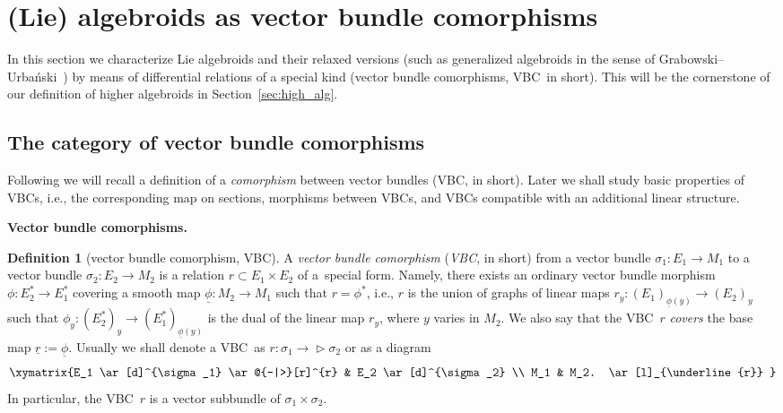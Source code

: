 \documentclass[pdftex]{sigma}
\newcommand{\ZM}{{VBC}} %
\newcommand{\Zakrzewski}{{vector bundle comorphism}}
\newcommand{\BIGZakrzewski}{{Vector bundle comorphism}}
\newcommand{\und}{\underline}
\newcommand{\ra}{\rightarrow}
\def\relto{\rightarrow\!\!\vartriangleright} %
\numberwithin{equation}{section}
\theoremstyle{definition}
\newtheorem{df}[thm]{Definition}
\begin{document}
\section{(Lie) algebroids as \Zakrzewski s}\label{sec:algebroids_as_zm}

In this section we characterize Lie algebroids and their relaxed versions (such as generalized algebroids in the sense of Grabowski--Urba\'nski~\cite{JG_PU_Algebroids_1999}) by means of differential relations of a special kind (\Zakrzewski s, \ZM\ in short). This will be the cornerstone of our definition of higher algebroids in Section~\ref{sec:high_alg}.

\subsection{The category of \Zakrzewski s}

Following \cite{HM_1993, Mackenzie_lie_2005} we will recall a definition of a \emph{comorphism} between vector bundles (\ZM, in short). Later we shall study basic properties of \ZM s, i.e., the corresponding map on sections, morphisms between \ZM s, and \ZM s compatible with an additional linear structure.

{\bf \BIGZakrzewski s.}
\begin{df}[\Zakrzewski, \ZM ]\label{def:zm} A \emph{\Zakrzewski } (\emph{\ZM }, in short) from a vector bundle $\sigma_1\colon E_1\ra M_1$ to a vector bundle $\sigma_2\colon E_2\ra M_2$ is a relation $r\subset E_1 \times E_2$ of a~special form. Namely, there exists an ordinary vector bundle morphism $\phi\colon E_2^\ast\ra E_1^\ast$ covering a smooth map $\und{\phi}\colon M_2\ra M_1$ such that $r = \phi^\ast$, i.e., $r$ is the union of graphs of linear maps $r_y\colon (E_1)_{\und{\phi}(y)} \ra (E_2)_{y}$ such that $\phi_y\colon (E_2^\ast)_{y} \ra (E_1^\ast)_{\und{\phi}(y)}$ is the dual of the linear map $r_y$, where $y$ varies in $M_2$. We also say that the \ZM\ $r$ \emph{covers} the base map $\und{r}:=\und{\phi}$. Usually we shall denote a \ZM\ as $r\colon \sigma_1\relto \sigma_2$ or as a diagram
\begin{gather*}
\xymatrix{E_1 \ar[d]^{\sigma_1} \ar@{-|>}[r]^{r} & E_2 \ar[d]^{\sigma_2} \\ %
M_1 & M_2. \ar[l]_{\und{r}} }
\end{gather*}
In particular, the \ZM\ $r$ is a vector subbundle of $\sigma_1\times \sigma_2$.
\end{df}
\end{document}
